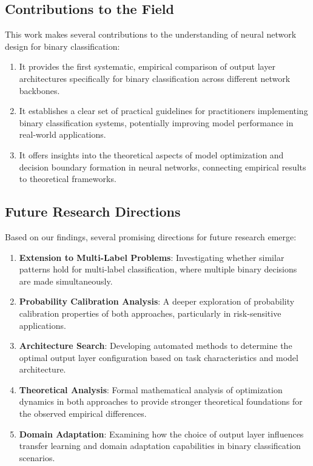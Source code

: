 \subsection{Contributions to the Field}

This work makes several contributions to the understanding of neural network design for binary classification:

\begin{enumerate}
\item It provides the first systematic, empirical comparison of output layer architectures specifically for binary classification across different network backbones.

\item It establishes a clear set of practical guidelines for practitioners implementing binary classification systems, potentially improving model performance in real-world applications.

\item It offers insights into the theoretical aspects of model optimization and decision boundary formation in neural networks, connecting empirical results to theoretical frameworks.
\end{enumerate}

\subsection{Future Research Directions}

Based on our findings, several promising directions for future research emerge:

\begin{enumerate}
\item \textbf{Extension to Multi-Label Problems}: Investigating whether similar patterns hold for multi-label classification, where multiple binary decisions are made simultaneously.

\item \textbf{Probability Calibration Analysis}: A deeper exploration of probability calibration properties of both approaches, particularly in risk-sensitive applications.

\item \textbf{Architecture Search}: Developing automated methods to determine the optimal output layer configuration based on task characteristics and model architecture.

\item \textbf{Theoretical Analysis}: Formal mathematical analysis of optimization dynamics in both approaches to provide stronger theoretical foundations for the observed empirical differences.

\item \textbf{Domain Adaptation}: Examining how the choice of output layer influences transfer learning and domain adaptation capabilities in binary classification scenarios.
\end{enumerate}

